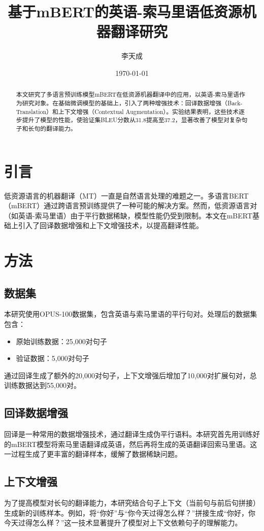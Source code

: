 \documentclass[a4paper,12pt]{article}
\title{基于mBERT的英语-索马里语低资源机器翻译研究}
\author{李天成}
\date{\today}
\begin{document}
\maketitle

\begin{abstract}
本文研究了多语言预训练模型mBERT在低资源机器翻译中的应用，以英语-索马里语作为研究对象。在基础微调模型的基础上，引入了两种增强技术：回译数据增强（Back-Translation）和上下文增强（Contextual Augmentation）。实验结果表明，这些技术逐步提升了模型的性能，使验证集BLEU分数从31.8提高至37.2，显著改善了模型对复杂句子和长句的翻译能力。
\end{abstract}

\section{引言}
低资源语言的机器翻译（MT）一直是自然语言处理的难题之一。多语言BERT（mBERT）通过跨语言预训练提供了一种可能的解决方案。然而，低资源语言对（如英语-索马里语）由于平行数据稀缺，模型性能仍受到限制。本文在mBERT基础上引入了回译数据增强和上下文增强技术，以提高翻译性能。

\section{方法}

\subsection{数据集}
本研究使用OPUS-100数据集，包含英语与索马里语的平行句对。处理后的数据集包含：
\begin{itemize}
    \item 原始训练数据：25,000对句子
    \item 验证数据：5,000对句子
\end{itemize}
通过回译生成了额外的20,000对句子，上下文增强后增加了10,000对扩展句对，总训练数据达到55,000对。

\subsection{回译数据增强}
回译是一种常用的数据增强技术，通过翻译生成伪平行语料。本研究首先用训练好的mBERT模型将索马里语翻译成英语，然后再将生成的英语翻译回索马里语。这一过程生成了更丰富的翻译样本，缓解了数据稀缺问题。

\subsection{上下文增强}
为了提高模型对长句的翻译能力，本研究结合句子上下文（当前句与前后句拼接）生成新的训练样本。例如，将“你好”与“你今天过得怎么样？”拼接生成“你好，你今天过得怎么样？”这一技术显著提升了模型对上下文依赖句子的理解能力。
\end{document}
